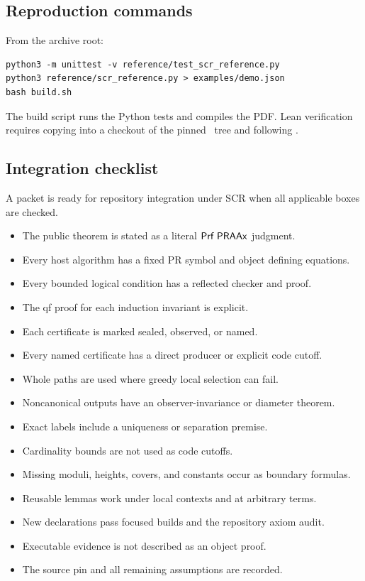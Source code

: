 \subsection{Reproduction commands}

From the archive root:
\begin{verbatim}
python3 -m unittest -v reference/test_scr_reference.py
python3 reference/scr_reference.py > examples/demo.json
bash build.sh
\end{verbatim}
The build script runs the Python tests and compiles the PDF.  Lean verification
requires copying  into a checkout of the pinned \repo\ tree and
following .

\subsection{Integration checklist}

A packet is ready for repository integration under SCR when all applicable
boxes are checked.

\begin{itemize}[label=$\square$]
\item The public theorem is stated as a literal \(\mathsf{Prf}\;\mathsf{PRAAx}\) judgment.
\item Every host algorithm has a fixed PR symbol and object defining equations.
\item Every bounded logical condition has a reflected checker and proof.
\item The qf proof for each induction invariant is explicit.
\item Each certificate is marked sealed, observed, or named.
\item Every named certificate has a direct producer or explicit code cutoff.
\item Whole paths are used where greedy local selection can fail.
\item Noncanonical outputs have an observer-invariance or diameter theorem.
\item Exact labels include a uniqueness or separation premise.
\item Cardinality bounds are not used as code cutoffs.
\item Missing moduli, heights, covers, and constants occur as boundary formulas.
\item Reusable lemmas work under local contexts and at arbitrary terms.
\item New declarations pass focused builds and the repository axiom audit.
\item Executable evidence is not described as an object proof.
\item The source pin and all remaining assumptions are recorded.
\end{itemize}

